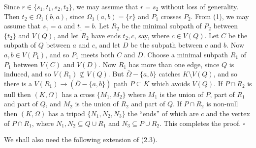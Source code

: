 Since $r \in \{s_1, t_1, s_2, t_2\}$, we may assume that $r = s_2$ without loss of generality. Then $t_2 \in \Omega_1(b, a)$, since $\Omega_1(a, b) = \{r\}$ and $P_1$ crosses $P_2$. From (1), we may assume that $s_1 = a$ and $t_1 = b$. Let $R_2$ be the minimal subpath of $P_2$ between $\{t_2\}$ and $V(Q)$, and let $R_2$ have ends $t_2, c$, say, where $c \in V(Q)$. Let $C$ be the subpath of $Q$ between $a$ and $c$, and let $D$ be the subpath between $c$ and $b$. Now $a, b \in V(P_1)$, and so $P_1$ meets both $C$ and $D$. Choose a minimal subpath $R_1$ of $P_1$ between $V(C)$ and $V(D)$. Now $R_1$ has more than one edge, since $Q$ is induced, and so $V(R_1) \nsubseteq V(Q)$. But $\bar{\Omega} - \{a, b\}$ catches $K \setminus V(Q)$, and so there is a $V(R_1) \to (\bar{\Omega} - \{a, b\})$ path $P \subseteq K$ which avoids $V(Q)$. If $P \cap R_2$ is null then $(K, \Omega)$ has a cross $\{M_1, M_2\}$ where $M_1$ is the union of $P$, part of $R_1$ and part of $Q$, and $M_2$ is the union of $R_2$ and part of $Q$. If $P \cap R_2$ is non-null then $(K, \Omega)$ has a tripod $\{N_1, N_2, N_3\}$ the ``ends'' of which are $c$ and the vertex of $P \cap R_1$, where $N_1, N_2 \subseteq Q \cup R_1$ and $N_3 \subseteq P \cup R_2$. This completes the proof. $\square$

We shall also need the following extension of (2.3).
